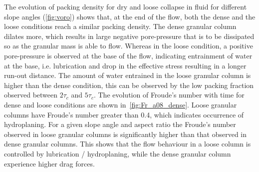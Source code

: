 The evolution of packing density for dry and loose collapse in fluid for 
different slope angles (\cref{fig:voro}) shows that, at the end 
of the flow, both the dense and the loose conditions reach a similar packing 
density. The dense granular column dilates more, which results in large 
negative pore-pressure that is to be dissipated so as the granular mass is able 
to flow. Whereas in the loose condition, a positive pore-pressure is observed 
at the base of the flow, indicating entrainment of 
water at the base, i.e. lubrication and drop in the effective stress resulting 
in a longer run-out distance. The amount of water entrained in the loose 
granular column is higher than the dense condition, this can be observed by the 
low packing fraction observed between $2\tau_c$ and $5 \tau_c$. The evolution 
of Froude's number with time for dense and loose conditions are shown 
in~\cref{fig:Fr_a08_dense}. Loose granular columns have Froude's number greater 
than 0.4, which indicates occurrence of hydroplaning. For a given slope angle 
and aspect ratio the Froude's number observed in loose granular columns is 
significantly higher than that observed in dense granular columns. This shows 
that the flow behaviour in a loose column is controlled by lubrication / 
hydroplaning, while the dense granular column experience higher drag forces.

